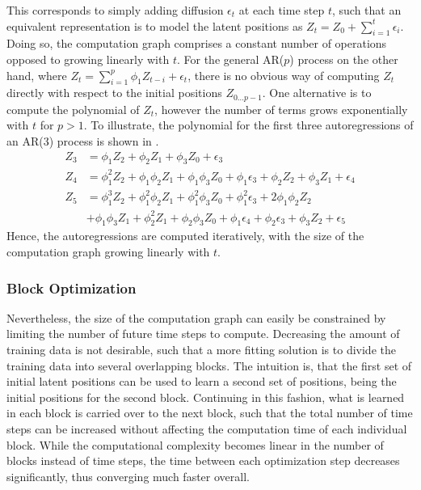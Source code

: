         This corresponds to simply adding diffusion $\epsilon_t$ at each time step $t$, such that an equivalent representation is to model the latent positions as $Z_t=Z_0+\sum_{i=1}^t\epsilon_i$. Doing so, the computation graph comprises a constant number of operations opposed to growing linearly with $t$.
        For the general AR($p$) process on the other hand, where $Z_t=\sum_{i=1}^p \phi_1 Z_{t-i} + \epsilon_t$, there is no obvious way of computing $Z_t$ directly with respect to the initial positions $Z_{0\dots p-1}$. One alternative is to compute the polynomial of $Z_t$, however the number of terms grows exponentially with $t$ for $p>1$. To illustrate, the polynomial for the first three autoregressions of an AR(3) process is shown in .
        \begin{equation}\label{eq:pyimpl-ar-polynomial}
        \begin{split}
            Z_3 &= \phi_1Z_2 + \phi_2Z_1 + \phi_3Z_0 + \epsilon_3 \\
            Z_4 &= \phi_1^2Z_2 + \phi_1\phi_2Z_1 + \phi_1\phi_3Z_0 + \phi_1\epsilon_3 + \phi_2Z_2 + \phi_3Z_1 + \epsilon_4 \\
            Z_5 &= \phi_1^3Z_2 + \phi_1^2\phi_2Z_1 + \phi_1^2\phi_3Z_0 + \phi_1^2\epsilon_3 + 2\phi_1\phi_2Z_2 \\
                &+ \phi_1\phi_3Z_1 + \phi_2^2Z_1 + \phi_2\phi_3Z_0 + \phi_1\epsilon_4 + \phi_2\epsilon_3 + \phi_3Z_2 + \epsilon_5
        \end{split}
        \end{equation}
        Hence, the autoregressions are computed iteratively, with the size of the computation graph growing linearly with $t$.
        
    \subsubsection{Block Optimization}
    
        Nevertheless, the size of the computation graph can easily be constrained by limiting the number of future time steps to compute. Decreasing the amount of training data is not desirable, such that a more fitting solution is to divide the training data into several overlapping blocks. 
        The intuition is, that the first set of initial latent positions can be used to learn a second set of positions, being the initial positions for the second block. Continuing in this fashion, what is learned in each block is carried over to the next block, such that the total number of time steps can be increased without affecting the computation time of each individual block. 
        While the computational complexity becomes linear in the number of blocks instead of time steps, the time between each optimization step decreases significantly, thus converging much faster overall.
        
